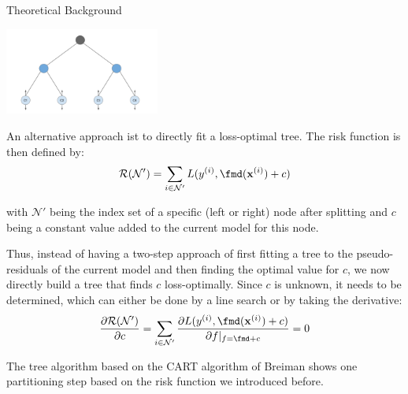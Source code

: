 \begin{vbframe}{Theoretical Background}
\begin{small}
\vspace{-0.5cm}

\begin{center}

\includegraphics[width=0.38\textwidth]{figure_man/gbm_leaf_adjustment.pdf}

\end{center}

\end{small}

\framebreak

An alternative approach ist to directly fit a loss-optimal tree.
The risk function is then defined by:
$$
\mathcal{R}(\mathcal{N}') = \sum_{i \in \mathcal{N}'} L(\yi, \fmd(\xi) + c)
$$

with $\mathcal{N}'$ being the index set of a specific (left or right) node after splitting and $c$ being a constant value added to the current model for this node.

Thus, instead of having a two-step approach of first fitting a tree to the pseudo-residuals of the current model and then finding the optimal value for $c$, we now directly build a tree that finds $c$ loss-optimally. Since $c$ is unknown, it needs to be determined, which can either be done by a line search or by taking the derivative:
$$
\frac{\partial{\mathcal{R}(\mathcal{N}')}}{\partial c} = \sum_{i \in \mathcal{N}'} \frac{\partial{L(\yi, \fmd(\xi) + c)}}{\partial f \rvert_{f = \fmd + c}} = 0
$$
\framebreak


The tree algorithm based on the CART algorithm of Breiman shows one partitioning step based on the risk function we introduced before.
\end{vbframe}



